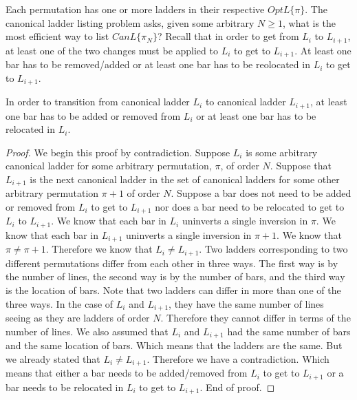 Each permutation has one or more ladders in their respective 
$OptL\{\pi\}$. The canonical ladder listing  problem asks, given some arbitrary $N \geq 1$,
what is the most efficient way to list $CanL\{\pi_{N}\}$? Recall that in order to get from $L_{i}$ to $L_{i+1}$, at least one of the 
two changes must be applied to $L_{i}$ to get to $L_{i+1}$. At least one bar has to be removed/added or at least one bar 
has to be reolocated in $L_{i}$ to get to $L_{i+1}$.

\begin{theorem}
    In order to transition from canonical ladder $L_{i}$ to canonical ladder $L_{i+1}$, at least one bar has to be added or 
    removed from $L_{i}$ or at least one bar has to be relocated in $L_{i}$.
\end{theorem}
\begin{proof}
    We begin this proof by contradiction. Suppose $L_{i}$ is some arbitrary canonical ladder for some arbitrary permutation, $\pi$, of 
    order $N$. Suppose that $L_{i+1}$ is the next canonical ladder in the set of canonical ladders for some other arbitrary permutation $\pi+1$ 
    of order $N$. Suppose a bar does not need to be added or removed from $L_{i}$ to get to $L_{i+1}$ nor does a bar need to be relocated to get to $L_{i}$ to 
    $L_{i+1}$. We know that each bar in $L_{i}$ uninverts a single inversion in $\pi$. We know that each bar in $L_{i+1}$ 
    uninverts a single inversion in $\pi+1$. We know that $\pi \neq \pi+1$. Therefore we know that $L_{i} \neq L_{i+1}$. Two ladders corresponding to 
    two different permutations differ from each other in three ways. The first way is by the number of lines, the second way is by the number of 
    bars, and the third way is the location of bars. Note that two ladders can differ in more than one of the three ways. In the case 
    of $L_{i}$ and $L_{i+1}$, they have the same number of lines seeing as they are ladders of order $N$. Therefore they cannot differ in terms 
    of the number of lines. We also assumed that $L_{i}$ and $L_{i+1}$ had the same number of bars and the same location of bars. Which means 
    that the ladders are the same. But we already stated that $L_{i} \neq L_{i+1}$. Therefore we have a contradiction. Which means that 
    either a bar needs to be added/removed from $L_{i}$ to get to $L_{i+1}$ or a bar needs to be relocated in $L_{i}$ to get to $L_{i+1}$. End of proof.
\end{proof}


